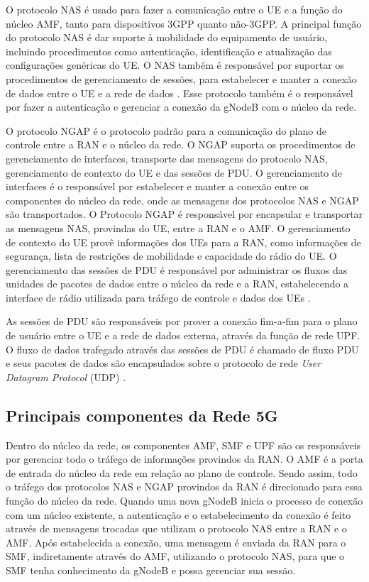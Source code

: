 O protocolo NAS é usado para fazer a comunicação entre o UE e a função do núcleo AMF, tanto para dispositivos 3GPP quanto não-3GPP. A principal função do protocolo NAS é dar suporte à mobilidade do equipamento de usuário, incluindo procedimentos como autenticação, identificação e atualização das configurações genéricas do UE. O NAS também é responsável por suportar os procedimentos de gerenciamento de sessões, para estabelecer e manter a conexão de dados entre o UE e a rede de dados \cite{3gpp.24.501}. Esse protocolo também é o responsável por fazer a autenticação e gerenciar a conexão da gNodeB com o núcleo da rede.

O protocolo NGAP é o protocolo padrão para a comunicação do plano de controle entre a RAN e o núcleo da rede. O NGAP suporta os procedimentos de gerenciamento de interfaces, transporte das mensagens do protocolo NAS, gerenciamento de contexto do UE e das sessões de PDU. O gerenciamento de interfaces é o responsável por estabelecer e manter a conexão entre os componentes do núcleo da rede, onde as mensagens dos protocolos NAS e NGAP são transportados. O Protocolo NGAP é responsável por encapsular e transportar as mensagens NAS, provindas do UE, entre a RAN e o AMF. O gerenciamento de contexto do UE provê informações dos UEs para a RAN, como informações de segurança, lista de restrições de mobilidade e capacidade do rádio do UE. O gerenciamento das sessões de PDU é responsável por administrar os fluxos das unidades de pacotes de dados entre o núcleo da rede e a RAN, estabelecendo a interface de rádio utilizada para tráfego de controle e dados dos UEs \cite{3gpp.38.413}.

As sessões de PDU são responsáveis por prover a conexão fim-a-fim para o plano de usuário entre o UE e a rede de dados externa, através da função de rede UPF.
O fluxo de dados trafegado através das sessões de PDU é chamado de fluxo PDU e seus pacotes de dados são encapsulados sobre o protocolo de rede \textit{User Datagram Protocol} (UDP) \cite{3gpp.38.415}.

\subsection{Principais componentes da Rede 5G}
\label{sub:components}

Dentro do núcleo da rede, os componentes AMF, SMF e UPF são os responsáveis por gerenciar todo o tráfego de informações provindos da RAN.
O AMF é a porta de entrada do núcleo da rede em relação ao plano de controle.
Sendo assim, todo o tráfego dos protocolos NAS e NGAP provindos da RAN é direcionado para essa função do núcleo da rede.
Quando uma nova gNodeB inicia o processo de conexão com um núcleo existente, a autenticação e o estabelecimento da conexão é feito através de mensagens trocadas que utilizam o protocolo NAS entre a RAN e o AMF.
Após estabelecida a conexão, uma mensagem é enviada da RAN para o SMF, indiretamente através do AMF, utilizando o protocolo NAS, para que o SMF tenha conhecimento da gNodeB e possa gerenciar sua sessão.

